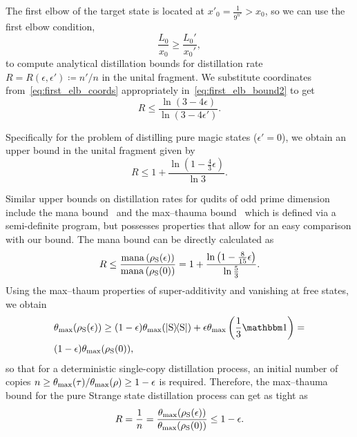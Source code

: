 \documentclass[pra,
aps,
twocolumn,
superscriptaddress,
groupedaddress,
nofootinbib,
reprint
]{revtex4-1}
\begin{document}
The first elbow of the target state is located at $x'_0 = \frac{1}{9^{n'}} > x_0$, so we can use the first elbow condition,
\begin{equation}\label{eq:first_elb_bound2}
	\frac{L_0}{x_0} \geq \frac{L_0'}{x_0'},
\end{equation}
to compute analytical distillation bounds for distillation rate $R = R(\epsilon, \epsilon') \coloneqq n'/n$ in the unital fragment.
We substitute coordinates from~\cref{eq:first_elb_coords} appropriately in~\cref{eq:first_elb_bound2} to get
\begin{equation}
	R \leq \frac{\ln{(3-4\epsilon)}}{\ln{(3-4\epsilon')}}.
\end{equation}

Specifically for the problem of distilling pure magic states ($\epsilon'=0$), we obtain an upper bound in the unital fragment given by
\begin{equation}
	R \leq 1 + \frac{\ln (1 - \frac{4}{3} \epsilon)}{\ln 3}.
\end{equation}

Similar upper bounds on distillation rates for qudits of odd prime dimension include the mana bound~\cite{cit:veitch} and the max--thauma bound~\cite{Wang2020} which is defined via a semi-definite program, but possesses properties that allow for an easy comparison with our bound.
The mana bound can be directly calculated as
\begin{equation}
	R \leq \frac{{{\rm{mana}}\left(\rho_{\rm{S}}(\epsilon)\right)}}{{{\rm{mana}}\left(\rho_{\rm{S}}(0)\right)}} = 1 + \frac{\ln \left(1 - \frac{8}{15}\epsilon \right)}{\ln \frac{5}{3}}.
\end{equation}
Using the max--thaum properties of super-additivity and vanishing at free states, we obtain
\begin{align}
	&\theta_{\rm{max}}(\rho_{\rm{S}}(\epsilon)) \geq (1-\epsilon) \theta_{\rm{max}}(\ketbra{\rm{S}}) + \epsilon \theta_{\rm{max}}\left(\frac{1}{3}\id \right) = \nonumber\\
	&(1-\epsilon) \theta_{\rm{max}}(\rho_{\rm{S}}(0)),
\end{align}
so that for a deterministic single-copy distillation process, an initial number of copies $n \geq \theta_{\rm{max}}(\tau) / \theta_{\rm{max}}(\rho) \geq 1-\epsilon$ is required.
Therefore, the max--thauma bound for the pure Strange state distillation process can get as tight as
\begin{equation}
	R = \frac{1}{n} = \frac{\theta_{\rm{max}}(\rho_{\rm{S}}(\epsilon))}{\theta_{\rm{max}}(\rho_{\rm{S}}(0))} \leq 1-\epsilon.
\end{equation}
\end{document}
